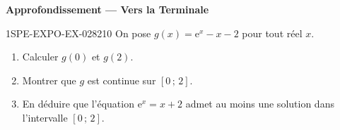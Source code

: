 \begin{center}\textbf{Approfondissement — Vers la Terminale}\end{center}
\begin{exercice}{1SPE-EXPO-EX-028}{2}{10}
On pose $g(x) = \mathrm{e}^x - x - 2$ pour tout réel $x$.
\begin{enumerate}
  \item Calculer $g(0)$ et $g(2)$.
  \item Montrer que $g$ est continue sur $[0\,;\,2]$.
  \item En déduire que l'équation $\mathrm{e}^x = x + 2$ admet au moins une solution dans l'intervalle $[0\,;\,2]$.
\end{enumerate}
\end{exercice}
